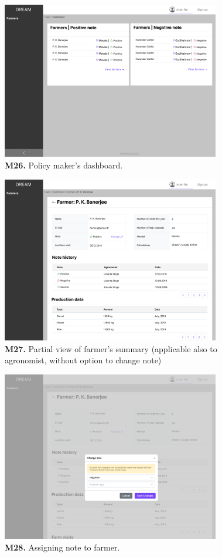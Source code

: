 \begin{figure}[H]
    \centering
    \includegraphics[width=0.85\textwidth]{mockups/Policy maker_Dashboard.png}
    \caption{\textbf{M26.} Policy maker's dashboard.}
\end{figure}

\begin{figure}[H]
    \centering
    \includegraphics[width=0.85\textwidth]{mockups/Policy maker_Dashboard_Farmers_Farmer_part1.png}
    \caption{\textbf{M27.} Partial view of farmer's summary (applicable also to agronomist, without option to change note)}
\end{figure}

\begin{figure}[H]
    \centering
    \includegraphics[width=0.85\textwidth]{mockups/Policy maker_Dashboard_Farmers_Farmer_Note_1.png}
    \caption{\textbf{M28.} Assigning note to farmer.}
\end{figure}
